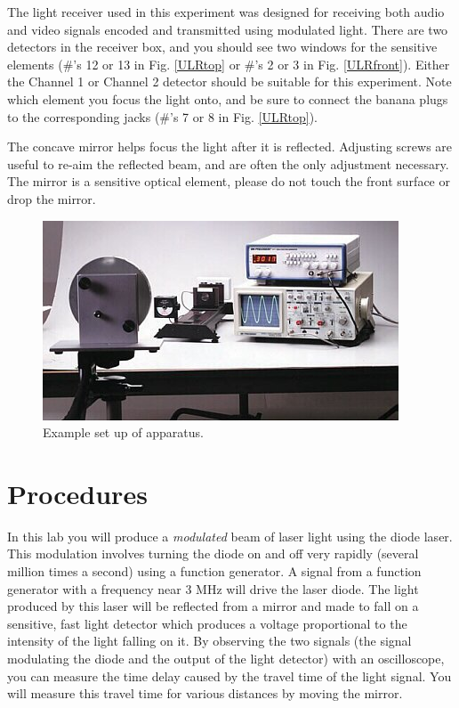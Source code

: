The light receiver used in this experiment was designed for receiving both audio and video signals encoded and transmitted using modulated light.  There are two detectors in the receiver box, and you should see two windows for the sensitive elements (\#'s 12 or 13 in Fig. \ref{ULRtop} or \#'s 2 or 3 in Fig. \ref{ULRfront}).
Either the Channel 1 or Channel 2 detector should be suitable for this experiment.  Note which element you focus the light onto, and be sure to connect the banana plugs to the corresponding jacks (\#'s 7 or 8 in Fig. \ref{ULRtop}).   

The concave mirror helps focus the light after it is reflected.  Adjusting screws are useful to re-aim the reflected beam, and are often the only adjustment necessary.  The mirror is a sensitive optical element, please do not touch the front surface or drop the mirror.

\begin{figure}
\includegraphics{../images/AP8586.jpg}
\caption{Example set up of apparatus.}
\end{figure}

\section{Procedures}

In this lab you will produce a {\em modulated} beam of laser light using the diode laser.  This modulation involves turning the diode on and off very rapidly (several million times a second) using a function generator.  A signal from a function generator with a frequency near 3 MHz will drive the laser diode.  The light produced by this laser will be reflected from a mirror and made to fall on a sensitive, fast light detector which produces a voltage proportional to the intensity of the light falling on it.  By observing the two signals (the signal modulating the diode and the output of the light detector) with an oscilloscope, you can measure the time delay caused by the travel time of the light signal.  You will measure this travel time for various distances by moving the mirror.

